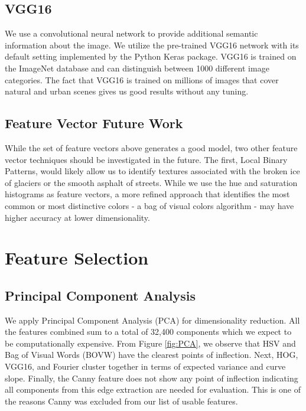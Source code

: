\documentclass[11pt]{article}
\begin{document}
\subsection{VGG16}
We use a convolutional neural network to provide additional semantic information about the image. We utilize the pre-trained VGG16 network\cite{SimonyanZisserman2014} with its default setting implemented by the Python Keras package. VGG16 is trained on the ImageNet database and can distinguish between 1000 different image categories. The fact that VGG16 is trained on millions of images that cover natural and urban scenes gives us good results without any tuning.

\subsection{Feature Vector Future Work}
While the set of feature vectors above generates a good model, two other feature vector techniques should be investigated in the future. The first, Local Binary Patterns\cite{Pietikainen2010}, would likely allow us to identify textures associated with the broken ice of glaciers or the smooth asphalt of streets. While we use the hue and saturation histograms as feature vectors, a more refined approach that identifies the most common or most distinctive colors - a bag of visual colors algorithm - may have higher accuracy at lower dimensionality.


\section{Feature Selection}
\subsection{Principal Component Analysis}
We apply Principal Component Analysis (PCA) for dimensionality reduction. All the features combined sum to a total of 32,400 components which we expect to be computationally expensive. From Figure \ref{fig:PCA}, we observe that HSV and Bag of Visual Words (BOVW) have the clearest points of inflection. Next, HOG, VGG16, and Fourier cluster together in terms of expected variance and curve slope. Finally, the Canny feature does not show any point of inflection indicating all components from this edge extraction are needed for evaluation. This is one of the reasons Canny was excluded from our list of usable features.
\end{document}
